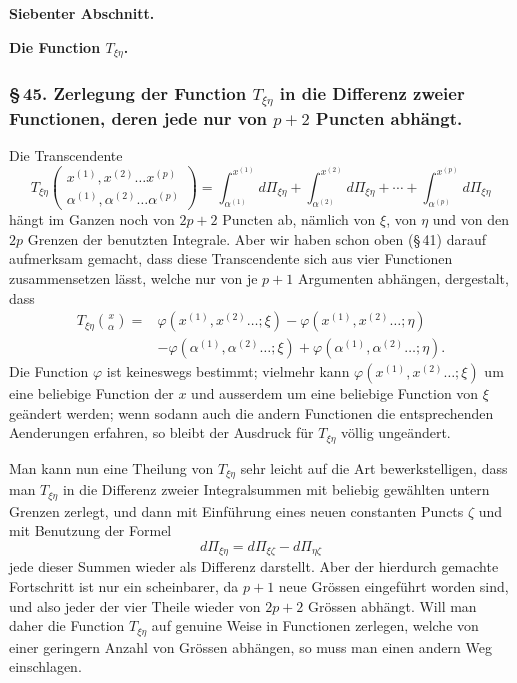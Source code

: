 \documentclass[10pt]{article}
\begin{document}

\begin{center}
{\large\bfseries Siebenter Abschnitt.}\par\vspace{0.8em}
{\Large\bfseries Die Function \(T_{\xi\eta}\).}
\end{center}

\subsubsection*{\S\,45. Zerlegung der Function \(T_{\xi\eta}\) in die Differenz zweier Functionen, deren jede nur von \(p+2\) Puncten abhängt.}

Die Transcendente
\[
T_{\xi\eta}\begin{pmatrix}x^{(1)},x^{(2)}\ldots x^{(p)}\\ \alpha^{(1)},\alpha^{(2)}\ldots \alpha^{(p)}\end{pmatrix}
=\int_{\alpha^{(1)}}^{x^{(1)}}d\Pi_{\xi\eta}
+\int_{\alpha^{(2)}}^{x^{(2)}}d\Pi_{\xi\eta}
+\cdots+\int_{\alpha^{(p)}}^{x^{(p)}}d\Pi_{\xi\eta}
\]
hängt im Ganzen noch von \(2p+2\) Puncten ab, nämlich von \(\xi\), von \(\eta\) und von den \(2p\) Grenzen der benutzten Integrale. Aber wir haben schon oben (\S\,41) darauf aufmerksam gemacht, dass diese Transcendente sich aus vier Functionen zusammensetzen lässt, welche nur von je \(p+1\) Argumenten abhängen, dergestalt, dass
\[
\begin{aligned}
T_{\xi\eta}\binom{x}{\alpha}={}&\varphi(x^{(1)},x^{(2)}\ldots;\xi)
-\varphi(x^{(1)},x^{(2)}\ldots;\eta)\\
&-\varphi(\alpha^{(1)},\alpha^{(2)}\ldots;\xi)
+\varphi(\alpha^{(1)},\alpha^{(2)}\ldots;\eta).
\end{aligned}
\]
Die Function \(\varphi\) ist keineswegs bestimmt; vielmehr kann \(\varphi(x^{(1)},x^{(2)}\ldots;\xi)\) um eine beliebige Function der \(x\) und ausserdem um eine beliebige Function von \(\xi\) geändert werden; wenn sodann auch die andern Functionen die entsprechenden Aenderungen erfahren, so bleibt der Ausdruck für \(T_{\xi\eta}\) völlig ungeändert.

Man kann nun eine Theilung von \(T_{\xi\eta}\) sehr leicht auf die Art bewerkstelligen, dass man \(T_{\xi\eta}\) in die Differenz zweier Integralsummen mit beliebig gewählten untern Grenzen zerlegt, und dann mit Einführung eines neuen constanten Puncts \(\zeta\) und mit Benutzung der Formel
\[
d\Pi_{\xi\eta}=d\Pi_{\xi\zeta}-d\Pi_{\eta\zeta}
\]
jede dieser Summen wieder als Differenz darstellt. Aber der hierdurch gemachte Fortschritt ist nur ein scheinbarer, da \(p+1\) neue Grössen eingeführt worden sind, und also jeder der vier Theile wieder von \(2p+2\) Grössen abhängt. Will man daher die Function \(T_{\xi\eta}\) auf genuine Weise in Functionen zerlegen, welche von einer geringern Anzahl von Grössen abhängen, so muss man einen andern Weg einschlagen.
\end{document}
